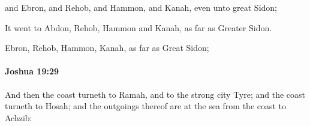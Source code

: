 			\begin{versebox}
					\item[BHS] 
					\item[ASV] and Ebron, and Rehob, and Hammon, and Kanah, even unto great Sidon;
					\item[NIV] It went to Abdon, Rehob, Hammon and Kanah, as far as Greater Sidon.
					\item[NRSV] Ebron, Rehob, Hammon, Kanah, as far as Great Sidon;
			\end{versebox}

		\paragraph{Joshua 19:29} %
			\label{JOSHUA-19-29}

			And then the coast turneth to Ramah, and to the strong city Tyre; and the coast turneth to Hosah; and the outgoings thereof are at the sea from the coast to Achzib:

